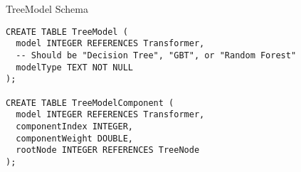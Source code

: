 \begin{listing}
\caption{TreeModel Schema}
\begin{verbatim}
CREATE TABLE TreeModel (
  model INTEGER REFERENCES Transformer,
  -- Should be "Decision Tree", "GBT", or "Random Forest"
  modelType TEXT NOT NULL 
);

CREATE TABLE TreeModelComponent (
  model INTEGER REFERENCES Transformer,
  componentIndex INTEGER,
  componentWeight DOUBLE,
  rootNode INTEGER REFERENCES TreeNode
);
\end{verbatim}
\label{listing:treemodel}
\end{listing}

\clearpage
\newpage
